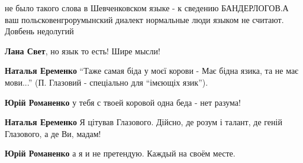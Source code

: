 \begin{itemize}
\begin{itemize}
не было такого слова в Шевченковском языке - к сведению БАНДЕРЛОГОВ.А ваш
польсковенгрорумынский диалект нормальные люди языком не считают. Довбень
недолугий 🤣🤣🤣


\textbf{Лана Свет}, но язык то есть! Шире мысли!

\textbf{Наталья Еременко} \enquote{Таже самая біда у моєї корови -
Має бідна язика, та не має мови...} (П. Глазовий - спеціально для \enquote{імєющіх язик}).

\textbf{Юрій Романенко} у тебя с твоей коровой одна беда - нет разума!🤣

\textbf{Наталья Еременко} Я цітував Глазового. Дійсно, де розум і талант, де геній Глазового, а де Ви, мадам!

\textbf{Юрій Романенко} а я и не претендую. Каждый на своём месте.

\end{itemize}

\end{itemize}

